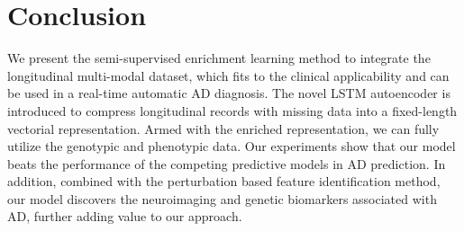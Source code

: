 \iffalse
An important characteristic of the present study was the use of a semi-supervised classification method for the AD conversion prediction in MCI subjects. The semi-supervised method (LDS) was shown to outperform its counterpart supervised method (SVM) in the design of MRI biomarker.
\fi
\section{Conclusion}
We present the semi-supervised enrichment learning method to integrate the longitudinal multi-modal dataset, which fits to the clinical applicability and can be used in a real-time automatic AD diagnosis. The novel LSTM autoencoder is introduced to compress longitudinal records with missing data into a fixed-length vectorial representation. Armed with the enriched representation, we can fully utilize the genotypic and phenotypic data. Our experiments show that our model beats the performance of the competing predictive models in AD prediction. In addition, combined with the perturbation based feature identification method, our model discovers the neuroimaging and genetic biomarkers associated with AD, further adding value to our approach.
